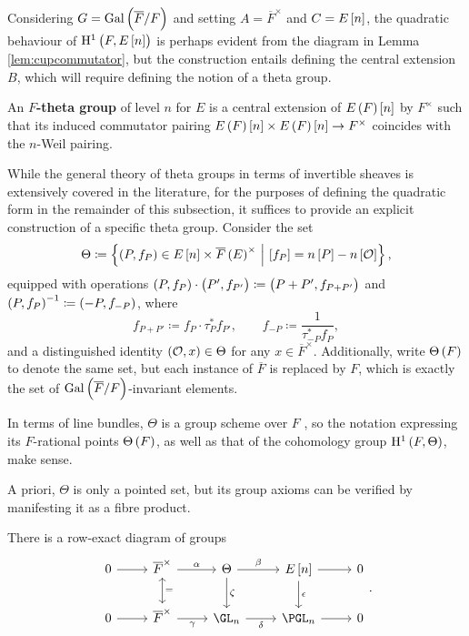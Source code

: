 \pagebreak

Considering $ G = \AG{F} $ and setting $ A = \overline{F}^\times $ and $ C = E\sbr{n} $, the quadratic behaviour of $ \HE[n]{F} $ is perhaps evident from the diagram in Lemma \ref{lem:cupcommutator}, but the construction entails defining the central extension $ B $, which will require defining the notion of a theta group.

\begin{definition}
An \textbf{$ F $-theta group} of level $ n $ for $ E $ is a central extension of $ E\br{F}\sbr{n} $ by $ F^\times $ such that its induced commutator pairing $ E\br{F}\sbr{n} \times E\br{F}\sbr{n} \to F^\times $ coincides with the $ n $-Weil pairing.
\end{definition}

While the general theory of theta groups in terms of invertible sheaves is extensively covered in the literature, for the purposes of defining the quadratic form in the remainder of this subsection, it suffices to provide an explicit construction of a specific theta group. Consider the set
$$ \Theta \coloneqq \cbr{\br{P, f_P} \in E\sbr{n} \times \overline{F}\br{E}^\times \st \sbr{f_P} = n\sbr{P} - n\sbr{\OOO}}, $$
equipped with operations $ \br{P, f_P} \cdot \br{P', f_{P'}} \coloneqq \br{P + P', f_{P + P'}} $ and $ \br{P, f_P}^{-1} \coloneqq \br{-P, f_{-P}} $, where
$$ f_{P + P'} \coloneqq f_P \cdot \tau_P^*f_{P'}, \qquad f_{-P} \coloneqq \dfrac{1}{\tau_{-P}^*f_P}, $$
and a distinguished identity $ \br{\OOO, x} \in \Theta $ for any $ x \in \overline{F}^\times $. Additionally, write $ \Theta\br{F} $ to denote the same set, but each instance of $ \overline{F} $ is replaced by $ F $, which is exactly the set of $ \AG{F} $-invariant elements.

\begin{remark}
In terms of line bundles, $ \Theta $ is a group scheme over $ F $ \cite[Section IV.23]{Mum70}, so the notation expressing its $ F $-rational points $ \Theta\br{F} $, as well as that of the cohomology group $ \H^1\br{F, \Theta} $, make sense.
\end{remark}

A priori, $ \Theta $ is only a pointed set, but its group axioms can be verified by manifesting it as a fibre product.

\begin{proposition}
\label{prop:thetagroup}
There is a row-exact diagram of groups
$$
\begin{tikzcd}
0 \arrow{r} & \overline{F}^\times \arrow{r}{\alpha} \arrow[leftrightarrow]{d}{=} & \Theta \arrow{r}{\beta} \arrow{d}{\zeta} & E\sbr{n} \arrow{r} \arrow{d}{\epsilon} & 0 \\
0 \arrow{r} & \overline{F}^\times \arrow{r}[swap]{\gamma} & \GL_n \arrow{r}[swap]{\delta} & \PGL_n \arrow{r} & 0
\end{tikzcd}.
$$
\end{proposition}

